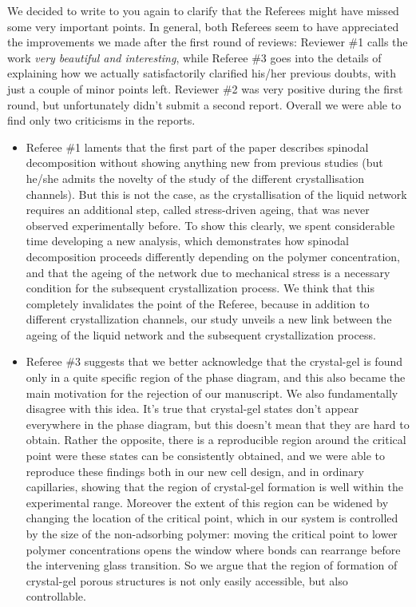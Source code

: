 \documentclass[11pt,a4paper]{article}
\begin{document}
We decided to write to you again to clarify that the Referees might have missed some very important points. In general, both Referees seem to have appreciated the improvements 
we made after the first round of reviews: Reviewer \#1 calls the work \emph{very beautiful and interesting}, while Referee \#3 goes into the details of explaining how we actually satisfactorily clarified his/her previous doubts, with just a couple of minor points left. Reviewer \#2 was very positive during the first round, but unfortunately didn't submit a second report.
Overall we were able to find only two criticisms in the reports.
\begin{itemize}
 \item Referee \#1 laments that the first part of the paper describes spinodal decomposition without showing anything new from previous studies (but he/she admits the novelty of the study of the different crystallisation channels). But this is not the case, as the crystallisation of the liquid network requires an additional step, called stress-driven ageing, that was never observed experimentally before.
To show this clearly, we spent considerable time developing a new analysis, which demonstrates how spinodal decomposition proceeds differently depending on the polymer concentration, and that the ageing of the network due to mechanical stress is a necessary condition for the subsequent crystallization process. We think that this completely invalidates the point of the Referee, because in addition to different crystallization channels, our study unveils a new link between the ageing of the liquid network and the subsequent crystallization process.
 \item Referee \#3 suggests that we better acknowledge that the crystal-gel is found only in a quite specific region of the phase diagram, and this also became the main motivation for the rejection of our manuscript. We also fundamentally disagree with this idea. It's true that crystal-gel states don't appear everywhere in the phase diagram, but this doesn't mean that they are hard to obtain. Rather the opposite, there is a reproducible region around the critical point were these states can be consistently obtained, and we were able to reproduce these findings both in our new cell design, and in ordinary capillaries, showing that the region of crystal-gel formation is well within the experimental range. Moreover the extent of this region can be widened by changing the location of the critical point, which in our system is controlled by the size of the non-adsorbing polymer: moving the critical point to lower polymer concentrations opens the window where bonds can rearrange before the intervening glass transition. So we argue that the region of formation of crystal-gel porous structures is not only easily accessible, but also controllable.
\end{itemize}
\end{document}
